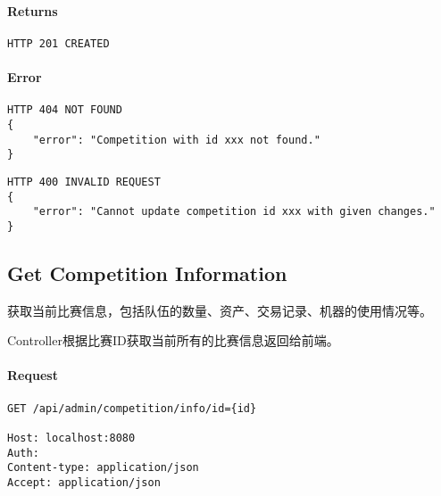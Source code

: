 \documentclass{article}
\begin{document}
\paragraph*{Returns}
\begin{lstlisting}
HTTP 201 CREATED
\end{lstlisting}

\paragraph*{Error}
\begin{lstlisting}
HTTP 404 NOT FOUND
{
    "error": "Competition with id xxx not found."
}
\end{lstlisting}

\begin{lstlisting}
HTTP 400 INVALID REQUEST
{
    "error": "Cannot update competition id xxx with given changes."
}
\end{lstlisting}

\subsection{Get Competition Information}
获取当前比赛信息，包括队伍的数量、资产、交易记录、机器的使用情况等。

Controller根据比赛ID获取当前所有的比赛信息返回给前端。

\paragraph*{Request}
\begin{lstlisting}
GET /api/admin/competition/info/id={id}

Host: localhost:8080
Auth:
Content-type: application/json
Accept: application/json
\end{lstlisting}
\end{document}
